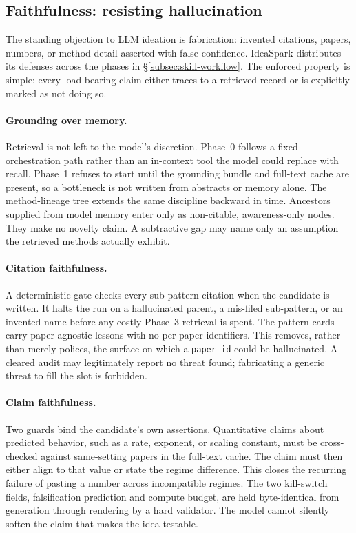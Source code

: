 \documentclass[10pt,a4paper]{article}
\begin{document}
\subsection{Faithfulness: resisting hallucination}
\label{subsec:faithfulness}

The standing objection to LLM ideation is fabrication: invented citations, papers, numbers, or method detail asserted with false confidence. IdeaSpark distributes its defenses across the phases in \S\ref{subsec:skill-workflow}. The enforced property is simple: every load-bearing claim either traces to a retrieved record or is explicitly marked as not doing so.

\paragraph{Grounding over memory.} Retrieval is not left to the model's discretion. Phase~0 follows a fixed orchestration path rather than an in-context tool the model could replace with recall. Phase~1 refuses to start until the grounding bundle and full-text cache are present, so a bottleneck is not written from abstracts or memory alone. The method-lineage tree extends the same discipline backward in time. Ancestors supplied from model memory enter only as non-citable, awareness-only nodes. They make no novelty claim. A subtractive gap may name only an assumption the retrieved methods actually exhibit.

\paragraph{Citation faithfulness.} A deterministic gate checks every sub-pattern citation when the candidate is written. It halts the run on a hallucinated parent, a mis-filed sub-pattern, or an invented name before any costly Phase~3 retrieval is spent. The pattern cards carry paper-agnostic lessons with no per-paper identifiers. This removes, rather than merely polices, the surface on which a \texttt{paper\_id} could be hallucinated. A cleared audit may legitimately report no threat found; fabricating a generic threat to fill the slot is forbidden.

\paragraph{Claim faithfulness.} Two guards bind the candidate's own assertions. Quantitative claims about predicted behavior, such as a rate, exponent, or scaling constant, must be cross-checked against same-setting papers in the full-text cache. The claim must then either align to that value or state the regime difference. This closes the recurring failure of pasting a number across incompatible regimes. The two kill-switch fields, falsification prediction and compute budget, are held byte-identical from generation through rendering by a hard validator. The model cannot silently soften the claim that makes the idea testable.
\end{document}
